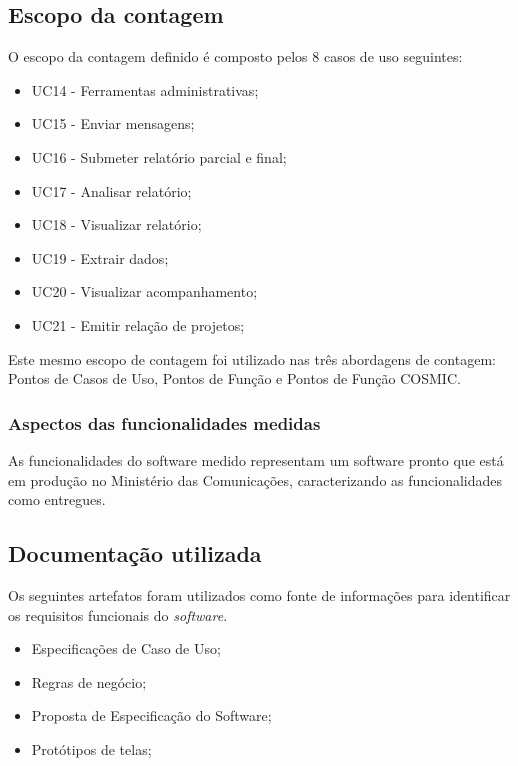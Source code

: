 	\subsection{Escopo da contagem}
	  
	  O escopo da contagem definido é composto pelos 8 casos de uso seguintes:
		
	  \begin{itemize}
		  

	      \item UC14 - Ferramentas administrativas;
	      \item UC15 - Enviar mensagens;
	      \item UC16 - Submeter relatório parcial e final;
	      \item UC17 - Analisar relatório;
	      \item UC18 - Visualizar relatório;
	      \item UC19 - Extrair dados;
	      \item UC20 - Visualizar acompanhamento;
	      \item UC21 - Emitir relação de projetos;	

	  \end{itemize}
	  
	  Este mesmo escopo de contagem foi utilizado nas três abordagens de contagem: Pontos de Casos de Uso, Pontos de Função e Pontos de Função COSMIC.
	  
	  \subsubsection{Aspectos das funcionalidades medidas}
	      
	      As funcionalidades do software medido representam um software pronto que está em produção no Ministério das Comunicações,
	      caracterizando as funcionalidades como entregues.
	  
	\subsection{Documentação utilizada}
	    
	    Os seguintes artefatos foram utilizados como fonte de informações para identificar os requisitos funcionais do \textit{software}.
	    
	    \begin{itemize}
	      \item Especificações de Caso de Uso;
	      \item Regras de negócio;
	      \item Proposta de Especificação do Software;
	      \item Protótipos de telas;
	    \end{itemize}